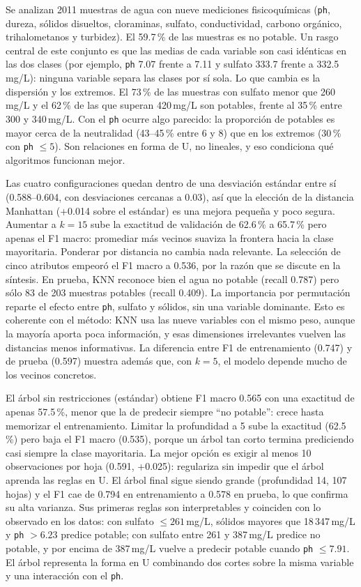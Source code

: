 Se analizan 2011 muestras de agua con nueve mediciones fisicoquímicas (\texttt{ph},
dureza, sólidos disueltos, cloraminas, sulfato, conductividad, carbono orgánico,
trihalometanos y turbidez). El 59.7\,\% de las muestras es no potable. Un rasgo
central de este conjunto es que las medias de cada variable son casi idénticas en las
dos clases (por ejemplo, \texttt{ph} 7.07 frente a 7.11 y sulfato 333.7 frente a
332.5\,mg/L): ninguna variable separa las clases por sí sola. Lo que cambia es la
dispersión y los extremos. El 73\,\% de las muestras con sulfato menor que 260\,mg/L
y el 62\,\% de las que superan 420\,mg/L son potables, frente al 35\,\% entre 300 y
340\,mg/L. Con el \texttt{ph} ocurre algo parecido: la proporción de potables es mayor
cerca de la neutralidad (43--45\,\% entre 6 y 8) que en los extremos (30\,\% con
\texttt{ph} $\le 5$). Son relaciones en forma de U, no lineales, y eso condiciona qué
algoritmos funcionan mejor.

Las cuatro configuraciones quedan dentro de una desviación estándar entre sí
(0.588--0.604, con desviaciones cercanas a 0.03), así que la elección de la distancia
Manhattan (+0.014 sobre el estándar) es una mejora pequeña y poco segura. Aumentar a
$k=15$ sube la exactitud de validación de 62.6\,\% a 65.7\,\% pero apenas el F1 macro:
promediar más vecinos suaviza la frontera hacia la clase mayoritaria. Ponderar por
distancia no cambia nada relevante. La selección de cinco atributos empeoró el F1 macro
a 0.536, por la razón que se discute en la síntesis. En prueba, KNN reconoce bien el
agua no potable (recall 0.787) pero sólo 83 de 203 muestras potables (recall 0.409).
La importancia por permutación reparte el efecto entre \texttt{ph}, sulfato y sólidos,
sin una variable dominante. Esto es coherente con el método: KNN usa las nueve
variables con el mismo peso, aunque la mayoría aporta poca información, y esas
dimensiones irrelevantes vuelven las distancias menos informativas. La diferencia entre
F1 de entrenamiento (0.747) y de prueba (0.597) muestra además que, con $k=5$, el
modelo depende mucho de los vecinos concretos.

El árbol sin restricciones (estándar) obtiene F1 macro 0.565 con una exactitud de
apenas 57.5\,\%, menor que la de predecir siempre ``no potable'': crece hasta
memorizar el entrenamiento. Limitar la profundidad a 5 sube la exactitud (62.5\,\%)
pero baja el F1 macro (0.535), porque un árbol tan corto termina prediciendo casi
siempre la clase mayoritaria. La mejor opción es exigir al menos 10 observaciones por
hoja (0.591, +0.025): regulariza sin impedir que el árbol aprenda las reglas en U. El
árbol final sigue siendo grande (profundidad 14, 107 hojas) y el F1 cae de 0.794 en
entrenamiento a 0.578 en prueba, lo que confirma su alta varianza. Sus primeras reglas
son interpretables y coinciden con lo observado en los datos: con sulfato
$\le 261$\,mg/L, sólidos mayores que 18\,347\,mg/L y \texttt{ph} $>6.23$ predice potable; con sulfato entre 261 y
387\,mg/L predice no potable, y por encima de 387\,mg/L vuelve a predecir potable
cuando \texttt{ph} $\le 7.91$. El árbol representa la forma en U combinando dos cortes
sobre la misma variable y una interacción con el \texttt{ph}.

